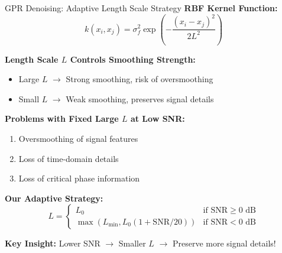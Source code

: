 \documentclass[aspectratio=169]{beamer}
\begin{document}
\begin{frame}{GPR Denoising: Adaptive Length Scale Strategy}
\textbf{RBF Kernel Function:}
\begin{equation}
k(x_i, x_j) = \sigma_f^2 \exp\left(-\frac{(x_i - x_j)^2}{2L^2}\right)
\end{equation}

\textbf{Length Scale $L$ Controls Smoothing Strength:}
\begin{itemize}
\item Large $L$ $\rightarrow$ Strong smoothing, risk of oversmoothing
\item Small $L$ $\rightarrow$ Weak smoothing, preserves signal details
\end{itemize}

\textbf{Problems with Fixed Large $L$ at Low SNR:}
\begin{enumerate}
\item \textcolor{zjutred}{Oversmoothing of signal features}
\item \textcolor{zjutred}{Loss of time-domain details}
\item \textcolor{zjutred}{Loss of critical phase information}
\end{enumerate}

\textbf{Our Adaptive Strategy:}
\begin{equation}
L = \begin{cases}
L_0 & \text{if SNR} \geq 0 \text{ dB} \\
\max(L_{\min}, L_0(1 + \text{SNR}/20)) & \text{if SNR} < 0 \text{ dB}
\end{cases}
\end{equation}

\textcolor{zjutgreen}{\textbf{Key Insight:}} Lower SNR $\rightarrow$ Smaller $L$ $\rightarrow$ Preserve more signal details!
\end{frame}
\end{document}
